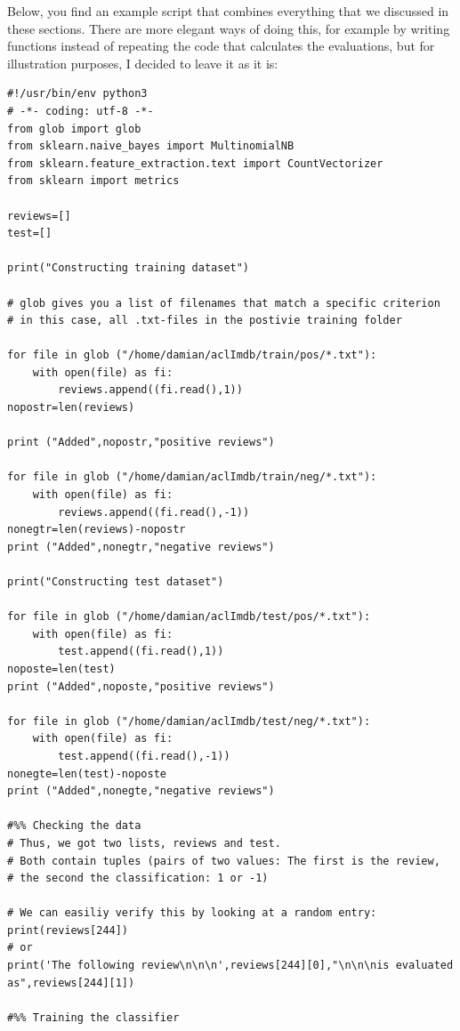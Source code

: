 \documentclass[a4paper,12pt]{book}
\begin{document}
Below, you find an example script that combines everything that we discussed in these sections. There are more elegant ways of doing this, for example by writing functions instead of repeating the code that calculates the evaluations, but for illustration purposes, I decided to leave it as it is:




\begin{lstlisting}
#!/usr/bin/env python3
# -*- coding: utf-8 -*-
from glob import glob
from sklearn.naive_bayes import MultinomialNB
from sklearn.feature_extraction.text import CountVectorizer
from sklearn import metrics

reviews=[]
test=[]

print("Constructing training dataset")

# glob gives you a list of filenames that match a specific criterion
# in this case, all .txt-files in the postivie training folder

for file in glob ("/home/damian/aclImdb/train/pos/*.txt"):
    with open(file) as fi:
        reviews.append((fi.read(),1))
nopostr=len(reviews)

print ("Added",nopostr,"positive reviews")  

for file in glob ("/home/damian/aclImdb/train/neg/*.txt"):
    with open(file) as fi:
        reviews.append((fi.read(),-1))
nonegtr=len(reviews)-nopostr
print ("Added",nonegtr,"negative reviews")  
   
print("Constructing test dataset")

for file in glob ("/home/damian/aclImdb/test/pos/*.txt"):
    with open(file) as fi:
        test.append((fi.read(),1))
noposte=len(test)
print ("Added",noposte,"positive reviews")  

for file in glob ("/home/damian/aclImdb/test/neg/*.txt"):
    with open(file) as fi:
        test.append((fi.read(),-1))
nonegte=len(test)-noposte
print ("Added",nonegte,"negative reviews")  

#%% Checking the data
# Thus, we got two lists, reviews and test.
# Both contain tuples (pairs of two values: The first is the review, 
# the second the classification: 1 or -1)
    
# We can easiliy verify this by looking at a random entry:
print(reviews[244])
# or
print('The following review\n\n\n',reviews[244][0],"\n\n\nis evaluated as",reviews[244][1])
    
#%% Training the classifier                


\end{lstlisting}
\end{document}

